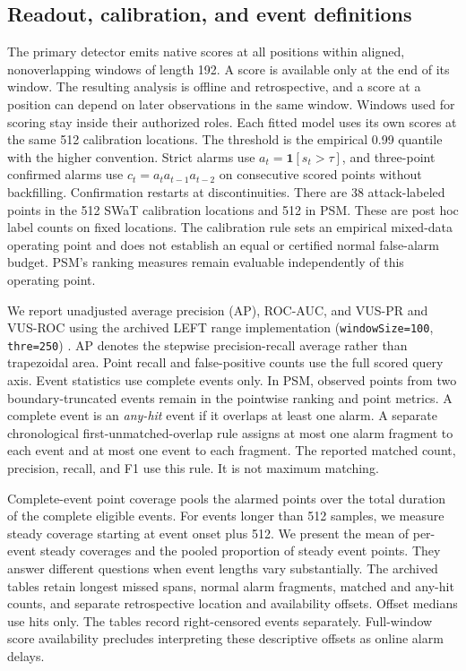 \documentclass[
  american,
]{article}
\begin{document}
\subsection{Readout, calibration, and event
definitions}\label{readout-calibration-and-event-definitions}

The primary detector emits native scores at all positions within
aligned, nonoverlapping windows of length 192. A score is available only
at the end of its window. The resulting analysis is offline and
retrospective, and a score at a position can depend on later
observations in the same window. Windows used for scoring stay inside
their authorized roles. Each fitted model uses its own scores at the
same 512 calibration locations. The threshold is the empirical 0.99
quantile with the higher convention. Strict alarms use
\(a_t=\mathbf{1}[s_t>\tau]\), and three-point confirmed alarms use
\(c_t=a_t a_{t-1}a_{t-2}\) on consecutive scored points without
backfilling. Confirmation restarts at discontinuities. There are 38
attack-labeled points in the 512 SWaT calibration locations and 512 in
PSM. These are post hoc label counts on fixed locations. The calibration
rule sets an empirical mixed-data operating point and does not establish
an equal or certified normal false-alarm budget. PSM's ranking measures
remain evaluable independently of this operating point.

We report unadjusted average precision (AP), ROC-AUC, and VUS-PR and
VUS-ROC using the archived LEFT range implementation
(\texttt{windowSize=100}, \texttt{thre=250}) \citep{vus2025}. AP denotes
the stepwise precision-recall average rather than trapezoidal area.
Point recall and false-positive counts use the full scored query axis.
Event statistics use complete events only. In PSM, observed points from
two boundary-truncated events remain in the pointwise ranking and point
metrics. A complete event is an \emph{any-hit} event if it overlaps at
least one alarm. A separate chronological first-unmatched-overlap rule
assigns at most one alarm fragment to each event and at most one event
to each fragment. The reported matched count, precision, recall, and F1
use this rule. It is not maximum matching.

Complete-event point coverage pools the alarmed points over the total
duration of the complete eligible events. For events longer than 512
samples, we measure steady coverage starting at event onset plus 512. We
present the mean of per-event steady coverages and the pooled proportion
of steady event points. They answer different questions when event
lengths vary substantially. The archived tables retain longest missed
spans, normal alarm fragments, matched and any-hit counts, and separate
retrospective location and availability offsets. Offset medians use hits
only. The tables record right-censored events separately. Full-window
score availability precludes interpreting these descriptive offsets as
online alarm delays.
\end{document}
